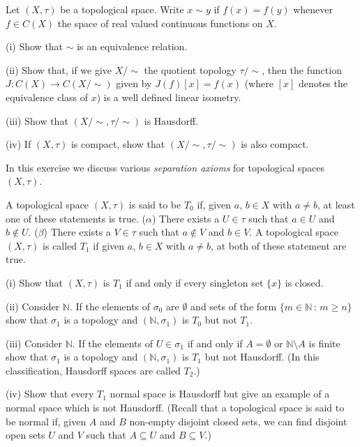 \begin{exercise}\label{C5.10} Let $(X,\tau)$ be a topological space.
Write $x\sim y$ if $f(x)=f(y)$ whenever $f\in C(X)$ the space
of real valued continuous functions on $X$.

(i) Show that $\sim$ is an equivalence relation.

(ii) Show that, if we give $X/\!\sim$ the quotient topology
$\tau/\!\sim$, then the function $J:C(X)\rightarrow C(X/\!\sim)$
given by $J(f)[x]=f(x)$ (where $[x]$ denotes the
equivalence class of $x$) is a well defined linear isometry.

(iii) Show that  $(X/\!\sim,\tau/\!\sim)$ is Hausdorff.

(iv) If $(X,\tau)$ is compact, show that $(X/\!\sim,\tau/\!\sim)$
is also compact.
\end{exercise}
\begin{exercise}\label{E;normal one}\label{C5.11} 
In this exercise we discuss various 
\emph{separation axioms} for topological spaces $(X,\tau)$.


A topological space $(X,\tau)$
is said to be $T_{0}$ if, given
$a,\,b\in X$ with $a\neq b$,
at least one of these statements is true.
($\alpha$) There exists a $U\in\tau$ such that $a\in U$
and $b\notin U$. ($\beta$) There exists a $V\in\tau$ such that $a\notin V$
and $b\in V$. A topological space $(X,\tau)$ is called $T_{1}$
if given
$a,\,b\in X$ with $a\neq b$,
at both of these statement are true.

(i) Show that $(X,\tau)$ is $T_{1}$ if and only if 
every singleton set $\{x\}$ is closed.

(ii) Consider ${\mathbb N}$. If the elements of $\sigma_{0}$ are
$\emptyset$ and sets of the form
$\{m\in{\mathbb N}\,:\,m\geq n\}$ show that $\sigma_{1}$
is a topology and $({\mathbb N},\sigma_{1})$ is $T_{0}$
but not $T_{1}$.

(iii) Consider ${\mathbb N}$. If the elements of $U\in\sigma_{1}$
if and only if $A=\emptyset$ or ${\mathbb N}\setminus A$ is finite
show that $\sigma_{1}$
is a topology and $({\mathbb N},\sigma_{1})$ is $T_{1}$
but not Hausdorff. (In this classification, Hausdorff spaces
are
called $T_{2}$.)

(iv) Show that every $T_{1}$ normal space is Hausdorff
but give an example of a normal space which is not
Hausdorff. (Recall that a topological space is said to be
normal if,
given $A$ and $B$ non-empty disjoint closed sets,
we can find disjoint open sets $U$ and $V$ such that
$A\subseteq U$ and $B\subseteq V$.)


\end{exercise}
